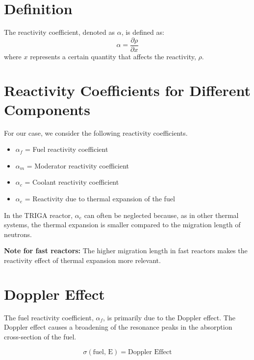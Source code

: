 \section{Definition}

The reactivity coefficient, denoted as $\alpha$, is defined as:
\begin{equation}
    \alpha = \frac{\partial \rho}{\partial x}
\end{equation}
where $x$ represents a certain quantity that affects the reactivity, $\rho$.

\section{Reactivity Coefficients for Different Components}

For our case, we consider the following reactivity coefficients.

\begin{itemize}
    \item $\alpha_f$ = Fuel reactivity coefficient
    \item $\alpha_m$ = Moderator reactivity coefficient
    \item $\alpha_c$ = Coolant reactivity coefficient
    \item $\alpha_e$ = Reactivity due to thermal expansion of the fuel
\end{itemize}

In the TRIGA reactor, $\alpha_e$ can often be neglected because, as in other thermal systems, the thermal expansion is smaller compared to the migration length of neutrons.

\begin{tcolorbox}[boxstyle2]
\textbf{Note for fast reactors:} The higher migration length in fast reactors makes the reactivity effect of thermal expansion more relevant.
\end{tcolorbox}

\section{Doppler Effect}

The fuel reactivity coefficient, $\alpha_f$, is primarily due to the Doppler effect. The Doppler effect causes a broadening of the resonance peaks in the absorption cross-section of the fuel.

\begin{equation}
    \sigma(\text{fuel, E}) = \text{Doppler Effect}
\end{equation}

